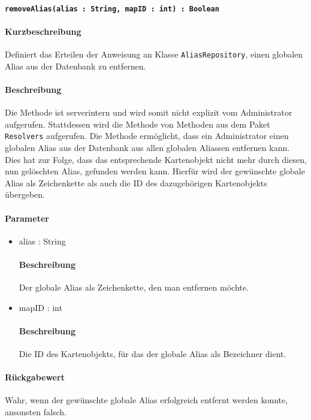 \paragraph{\texttt{removeAlias(alias : String, mapID : int) : Boolean}}%
\paragraph*{Kurzbeschreibung}
Definiert das Erteilen der Anweisung an Klasse \texttt{AliasRepository}, einen globalen Alias aus der Datenbank zu entfernen.
\paragraph*{Beschreibung}
Die Methode ist serverintern und wird somit nicht explizit vom Administrator aufgerufen.
Stattdessen wird die Methode von Methoden aus dem Paket \texttt{Resolvers} aufgerufen.
Die Methode ermöglicht, dass ein Administrator einen globalen Alias aus der Datenbank aus allen globalen Aliassen entfernen kann.
Dies hat zur Folge, dass das entsprechende Kartenobjekt nicht mehr durch diesen, nun gelöschten Alias, gefunden werden kann.
Hierfür wird der gewünschte globale Alias als Zeichenkette als auch die ID des dazugehörigen Kartenobjekts übergeben.
\paragraph*{Parameter}
\begin{itemize}
    \item alias : String
    		\paragraph*{Beschreibung}
    		Der globale Alias als Zeichenkette, den man entfernen möchte.
    \item mapID : int
    		\paragraph*{Beschreibung}
    		Die ID des Kartenobjekts, für das der globale Alias als Bezeichner dient.
\end{itemize}
\paragraph*{Rückgabewert}
Wahr, wenn der gewünschte globale Alias erfolgreich entfernt werden konnte, ansonsten falsch.
